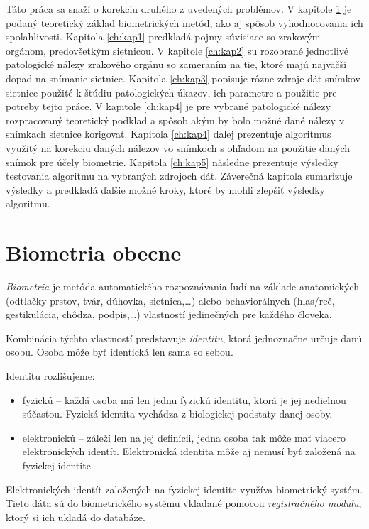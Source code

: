 Táto práca sa snaží o korekciu druhého z uvedených problémov. V kapitole \ref{ch:kap0} je podaný teoretický základ biometrických metód, ako aj spôsob vyhodnocovania ich spoľahlivosti. Kapitola \ref{ch:kap1} predkladá pojmy súvisiace so zrakovým orgánom, predovšetkým sietnicou. V kapitole \ref{ch:kap2} su rozobrané jednotlivé patologické nálezy zrakového orgánu so zameraním na tie, ktoré majú najväčší dopad na snímanie sietnice. Kapitola \ref{ch:kap3} popisuje rôzne zdroje dát snímkov sietnice použité k štúdiu patologických úkazov, ich parametre a použitie pre potreby tejto práce. V kapitole \ref{ch:kap4} je pre vybrané patologické nálezy rozpracovaný teoretický podklad a spôsob akým by bolo možné dané nálezy v snímkach sietnice korigovať. Kapitola \ref{ch:kap4} ďalej prezentuje algoritmus využitý na korekciu daných nálezov vo snímkoch s ohľadom na použitie daných snímok pre účely biometrie. Kapitola \ref{ch:kap5} následne prezentuje výsledky testovania algoritmu na vybraných zdrojoch dát. Záverečná kapitola sumarizuje výsledky a predkladá ďalšie možné kroky, ktoré by mohli zlepšiť výsledky algoritmu.

\chapter{Biometria obecne}\label{ch:kap0}
\emph{Biometria} je metóda automatického rozpoznávania ľudí na základe anatomických (odtlačky prstov, tvár, dúhovka, sietnica,\dots) alebo behaviorálnych (hlas/reč, gestikulácia, chôdza, podpis,\dots) vlastností jedinečných pre každého človeka.

Kombinácia týchto vlastností predstavuje \emph{identitu}, ktorá jednoznačne určuje danú osobu. Osoba môže byť identická len sama so sebou\cite{bio}.

Identitu rozlišujeme:
\begin{itemize}
\item fyzickú -- každá osoba má len jednu fyzickú identitu, ktorá je jej nedielnou súčasťou. Fyzická identita vychádza z biologickej podstaty danej osoby.
\item elektronickú -- záleží len na jej definícii, jedna osoba tak môže mať viacero elektronických identít. Elektronická identita môže aj nemusí byť založená na fyzickej identite.
\end{itemize}

Elektronických identít založených na fyzickej identite využíva biometrický systém. Tieto dáta sú do biometrického systému vkladané pomocou \emph{registračného modulu}, ktorý si ich ukladá do databáze.


